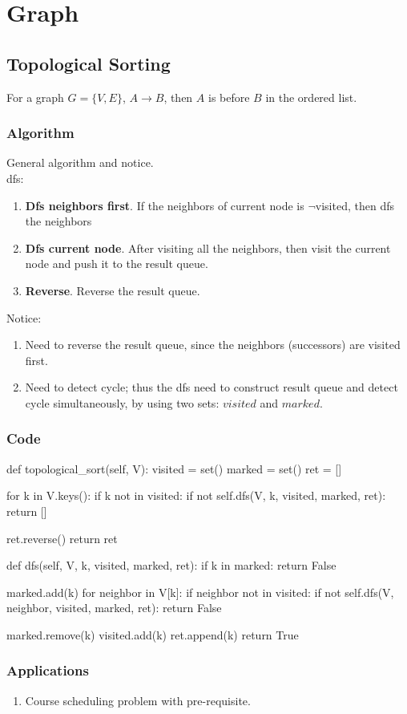 \chapter{Graph}


\section{Topological Sorting}
For a graph $G=\{V, E\}$, $ A \rightarrow B $, then $A$ is before $B$ in the ordered list. 
\subsection{Algorithm}
General algorithm and notice.\\
 
dfs:
\begin{enumerate}
\item \textbf{Dfs neighbors first}. If the neighbors of current node is  $\neg$visited, then dfs the neighbors
\item \textbf{Dfs current node}. After visiting all the neighbors, then visit the current node and push it to the result queue.
\item \textbf{Reverse}. Reverse the result queue. 
\end{enumerate}

Notice:
\begin{enumerate}
\item Need to reverse the result queue, since the neighbors (successors) are visited first. 
\item Need to detect cycle; thus the dfs need to construct result queue and detect cycle simultaneously, by using two sets: $visited$ and $marked$. 
\end{enumerate}

\subsection{Code}
\begin{python}
def topological_sort(self, V):
    visited = set()
    marked = set()
    ret = []

    for k in V.keys():
        if k not in visited:
            if not self.dfs(V, k, visited, marked, ret):
                return []

    ret.reverse()
    return ret

def dfs(self, V, k, visited, marked, ret):
    if k in marked:
        return False

    marked.add(k)
    for neighbor in V[k]:
        if neighbor not in visited:
            if not self.dfs(V, neighbor, visited, marked, ret):
                return False

    marked.remove(k)
    visited.add(k)
    ret.append(k)
    return True
\end{python}

\subsection{Applications}
\begin{enumerate}
\item Course scheduling problem with pre-requisite. 
\end{enumerate}

